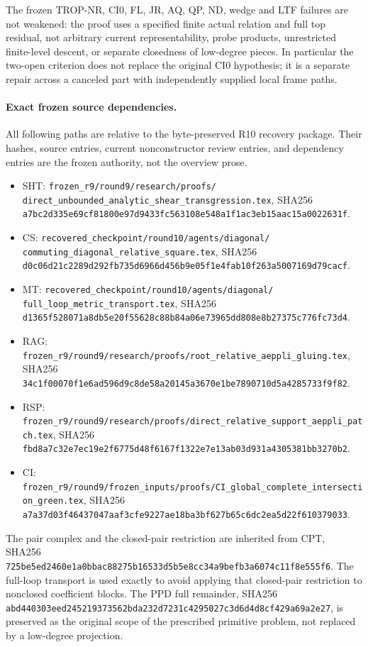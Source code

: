 The frozen TROP-NR, CI0, FL, JR, AQ, QP, ND, wedge and LTF
failures are not weakened: the proof uses a specified finite actual
relation and full top residual, not arbitrary current
representability, probe products, unrestricted finite-level descent,
or separate closedness of low-degree pieces.  In particular the
two-open criterion does not replace the original CI0 hypothesis;
it is a separate repair across a canceled part with independently
supplied local frame paths.

\paragraph{Exact frozen source dependencies.}
All following paths are relative to the byte-preserved R10 recovery
package.  Their hashes, source entries, current nonconstructor
review entries, and dependency entries are the frozen authority,
not the overview prose.
\begin{itemize}
\item SHT:
\texttt{frozen\_r9/round9/research/proofs/}
\texttt{direct\_unbounded\_analytic\_shear\_transgression.tex},
SHA256 \texttt{a7bc2d335e69cf81800e97d9433fc563108e548a1f1ac3eb15aac15a0022631f}.
\item CS:
\texttt{recovered\_checkpoint/round10/agents/diagonal/}
\texttt{commuting\_diagonal\_relative\_square.tex},
SHA256 \texttt{d0c06d21c2289d292fb735d6966d456b9e05f1e4fab10f263a5007169d79cacf}.
\item MT:
\texttt{recovered\_checkpoint/round10/agents/diagonal/}
\texttt{full\_loop\_metric\_transport.tex},
SHA256 \texttt{d1365f528071a8db5e20f55628c88b84a06e73965dd808e8b27375c776fc73d4}.
\item RAG:
\texttt{frozen\_r9/round9/research/proofs/root\_relative\_aeppli\_gluing.tex},
SHA256 \texttt{34c1f00070f1e6ad596d9c8de58a20145a3670e1be7890710d5a4285733f9f82}.
\item RSP:
\texttt{frozen\_r9/round9/research/proofs/direct\_relative\_support\_aeppli\_patch.tex},
SHA256 \texttt{fbd8a7c32e7ec19e2f6775d48f6167f1322e7e13ab03d931a4305381bb3270b2}.
\item CI:
\texttt{frozen\_r9/round9/frozen\_inputs/proofs/CI\_global\_complete\_intersection\_green.tex},
SHA256 \texttt{a7a37d03f46437047aaf3cfe9227ae18ba3bf627b65c6dc2ea5d22f610379033}.
\end{itemize}
The pair complex and the closed-pair restriction are inherited from
CPT, SHA256
\texttt{725be5ed2460e1a0bbac88275b16533d5b5e8cc34a9befb3a6074c11f8e555f6}.
The full-loop transport is used exactly to avoid applying that
closed-pair restriction to nonclosed coefficient blocks.  The PPD
full remainder, SHA256
\texttt{abd440303eed245219373562bda232d7231c4295027c3d6d4d8cf429a69a2e27},
is preserved as the original scope of the prescribed primitive
problem, not replaced by a low-degree projection.
